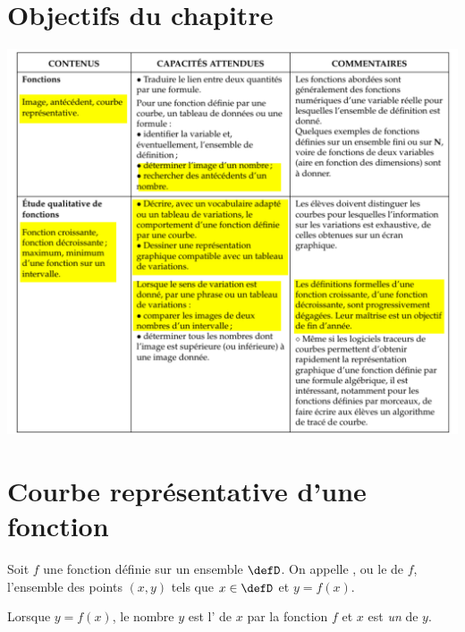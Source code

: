 
\section{Objectifs du chapitre}

\includegraphics[width=\linewidth]{BO_fonctions_graphique.pdf}



\section{Courbe représentative d'une fonction}


\begin{definition}
Soit $f$ une fonction définie sur un ensemble $\defD$.
    On appelle , ou le  de $f$, l'ensemble des points $(x,y)$ tels que $x\in\defD$ et $y=f(x)$.

    Lorsque \( y=f(x)\), le nombre \( y\) est l' de \( x\) par la fonction \( f\) et \( x\) est \emph{un}  de \( y\).
\end{definition}

